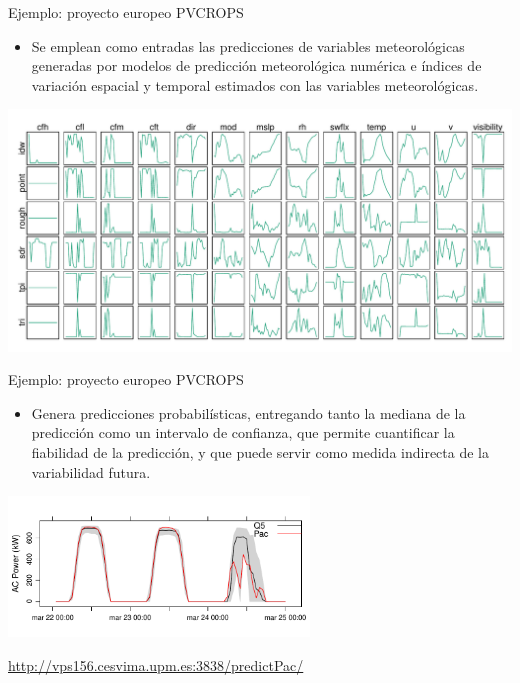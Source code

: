 \documentclass[aspectratio=169, usenames,svgnames,dvipsnames]{beamer}
\begin{document}
\begin{frame}[label={sec:org9034d88}]{Ejemplo: proyecto europeo PVCROPS}
\begin{itemize}
\item Se emplean como entradas las predicciones de variables
meteorológicas generadas por modelos de predicción meteorológica
numérica e índices de variación espacial y temporal estimados con
las variables meteorológicas.
\end{itemize}

\begin{center}
\includegraphics[height=0.7\textheight]{../figs/varsComplete.pdf}
\end{center}
\end{frame}


\begin{frame}[label={sec:orgfa175ba}]{Ejemplo: proyecto europeo PVCROPS}
\begin{itemize}
\item Genera predicciones probabilísticas, entregando tanto la mediana de
la predicción como un intervalo de confianza, que permite
cuantificar la fiabilidad de la predicción, y que puede servir como
medida indirecta de la variabilidad futura.
\end{itemize}

\begin{center}
\includegraphics[width=0.6\textwidth]{../figs/powerResult.pdf}
\end{center}

\begin{center}
\url{http://vps156.cesvima.upm.es:3838/predictPac/}
\end{center}
\end{frame}
\end{document}

